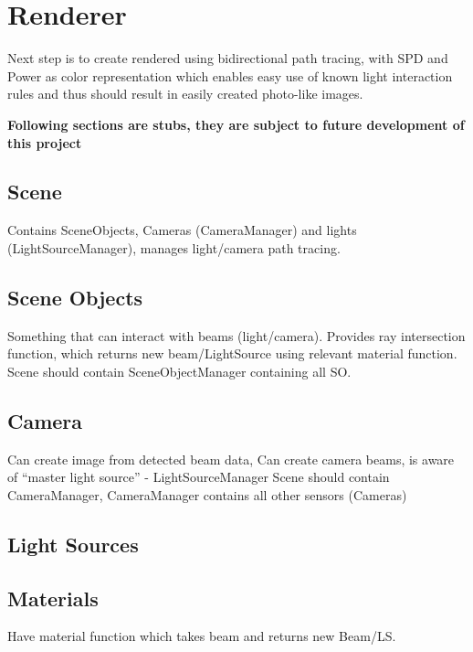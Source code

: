 \documentclass[12pt, letterpaper]{article}
\begin{document}
\section{Renderer}
Next step is to create rendered using bidirectional path tracing, with SPD and Power as color representation which enables easy use of known light interaction rules and thus should result in easily created photo-like images.

\textbf{Following sections are stubs, they are subject to future development of this project}

\subsection{Scene}
Contains SceneObjects, Cameras (CameraManager) and lights 	(LightSourceManager), manages light/camera path tracing.
\subsection{Scene Objects}
Something that can interact with beams (light/camera). Provides ray 	intersection function, which returns new beam/LightSource using relevant material function. Scene should contain SceneObjectManager containing all SO.
\subsection{Camera}
Can create image from detected beam data, Can create camera beams, 	is aware of “master light source” - LightSourceManager
Scene should contain CameraManager, CameraManager contains all  	other sensors (Cameras)
\subsection{Light Sources}
\subsection{Materials}
Have material function which takes beam and returns new Beam/LS.
\end{document}
